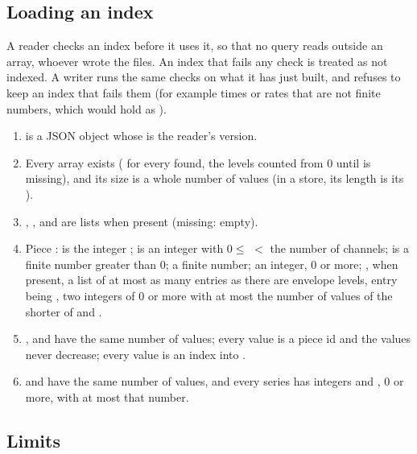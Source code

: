 \subsection{Loading an index}
\label{sec:formats-reference-loading}

A reader checks an index before it uses it, so that no query reads outside an array, whoever
wrote the files. An index that fails any check is treated as not indexed. A writer runs the same
checks on what it has just built, and refuses to keep an index that fails them (for example times
or rates that are not finite numbers, which  would hold as ).
\begin{enumerate}
\item {} is a JSON object whose  is the reader's version.
\item Every array exists ( for every  found, the levels
  counted from 0 until  is missing), and its size is a whole number of values
  (in a store, its length is its ).
\item {}, ,  and  are lists when
  present (missing: empty).
\item Piece :  is the integer ;  is an integer with
  $0 \le$  $<$ the number of channels;  is a finite number greater than 0;
   a finite number;  an integer, 0 or more; , when present, a list of
  at most as many entries as there are envelope levels, entry  being \code{[o, len]}, two
  integers of 0 or more with  at most the number of values of the shorter of
   and .
\item {},  and  have the same number of values;
  every  value is a piece id and the values never decrease; every 
  value is an index into .
\item {} and  have the same number of values, and every series has
  integers  and , 0 or more, with  at most that number.
\end{enumerate}

\subsection{Limits}
\label{sec:formats-reference-limits}

